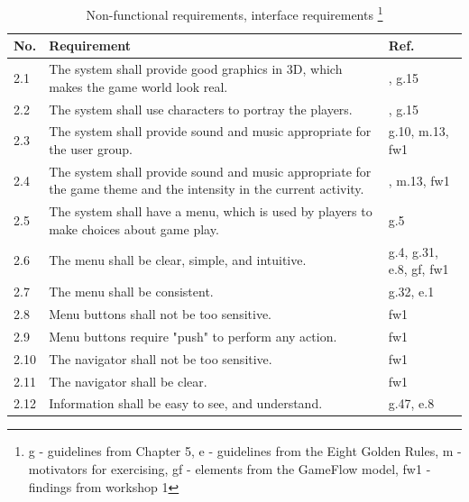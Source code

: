 \begin{minipage}{12 cm}
\begin{table} [H]
\centering
\begin{tabular}{|>{\raggedright}p{}|p{}|p{}|} 
\hline
\textbf{No.} & \textbf{Requirement} & \textbf{Ref.} \\ \hline
2.1 & The system shall provide good graphics in 3D, which makes the game world look real. & \cite{understandingvg}, g.15 \\ \hline
2.2 & The system shall use characters to portray the players. & \cite{understandingvg}, g.15 \\ \hline
2.3 & The system shall provide sound and music appropriate for the user group. & g.10, m.13, fw1 \\ \hline
2.4 & The system shall provide sound and music appropriate for the game theme and the intensity in the current activity. & \cite{umlapproach}, m.13, fw1 \\ \hline
2.5 & The system shall have a menu, which is used by players to make choices about game play. & g.5\\ \hline
2.6 & The menu shall be clear, simple, and intuitive. & g.4, g.31, e.8, gf, fw1 \\ \hline
2.7 & The menu shall be consistent. & g.32, e.1 \\ \hline
2.8 & Menu buttons shall not be too sensitive. & fw1 \\ \hline
2.9 & Menu buttons require "push" to perform any action. & fw1\\ \hline
2.10 & The navigator shall not be too sensitive. & fw1\\ \hline
2.11 & The navigator shall be clear. & fw1\\ \hline
2.12 & Information shall be easy to see, and understand. & g.47, e.8\\ \hline
\end{tabular}
\caption[Non-functional requirements, part 1]{Non-functional requirements, interface requirements \footnote{g - guidelines from Chapter 5, e - guidelines from the Eight Golden Rules, m - motivators for exercising, gf - elements from the GameFlow model, fw1 - findings from workshop 1}}
\label{tab:nfunc1}
\end{table} 
\end{minipage}

